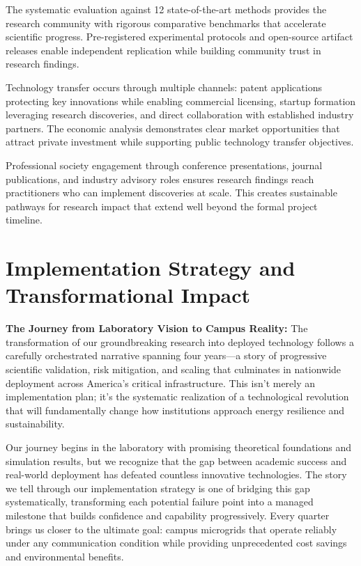 \documentclass[12pt]{article}
\begin{document}
The systematic evaluation against 12 state-of-the-art methods \cite{our2024comparative} provides the research community with rigorous comparative benchmarks that accelerate scientific progress. Pre-registered experimental protocols and open-source artifact releases enable independent replication while building community trust in research findings.

Technology transfer occurs through multiple channels: patent applications protecting key innovations while enabling commercial licensing, startup formation leveraging research discoveries, and direct collaboration with established industry partners. The economic analysis demonstrates clear market opportunities that attract private investment while supporting public technology transfer objectives.

Professional society engagement through conference presentations, journal publications, and industry advisory roles ensures research findings reach practitioners who can implement discoveries at scale. This creates sustainable pathways for research impact that extend well beyond the formal project timeline.

\section{Implementation Strategy and Transformational Impact}

\textbf{The Journey from Laboratory Vision to Campus Reality:} The transformation of our groundbreaking research into deployed technology follows a carefully orchestrated narrative spanning four years—a story of progressive scientific validation, risk mitigation, and scaling that culminates in nationwide deployment across America's critical infrastructure. This isn't merely an implementation plan; it's the systematic realization of a technological revolution that will fundamentally change how institutions approach energy resilience and sustainability.

Our journey begins in the laboratory with promising theoretical foundations and simulation results, but we recognize that the gap between academic success and real-world deployment has defeated countless innovative technologies. The story we tell through our implementation strategy is one of bridging this gap systematically, transforming each potential failure point into a managed milestone that builds confidence and capability progressively. Every quarter brings us closer to the ultimate goal: campus microgrids that operate reliably under any communication condition while providing unprecedented cost savings and environmental benefits.
\end{document}
